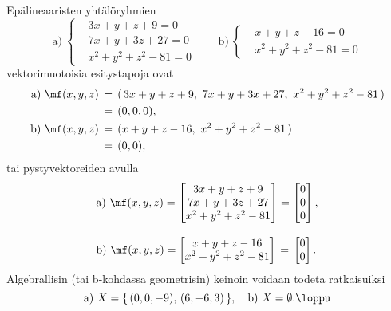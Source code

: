\begin{Exa}
Epälineaaristen yhtälöryhmien
\[ 
\text{a)} \ \left\{ \begin{aligned} 
                    &3x+y+z+9=0 \\ &7x+y+3z+27=0 \\ &x^2+y^2+z^2-81=0 
                    \end{aligned} \right.  \qquad
\text{b)} \ \left\{ \begin{aligned} &x+y+z-16=0 \\ &x^2+y^2+z^2-81=0 \end{aligned} \right.
\]
vektorimuotoisia esitystapoja ovat
\begin{align*}
\text{a)}\ \mf(x,y,z)\,&=\,(\,3x+y+z+9,\ 7x+y+3x+27,\ x^2+y^2+z^2-81\,) \\
                       &=\,(0,0,0), \\
\text{b)}\ \mf(x,y,z)\,&=\,(x+y+z-16,\ x^2+y^2+z^2-81\,) \\
                       &=\,(0,0),
\end{align*}
tai pystyvektoreiden avulla
\begin{align*}
&\text{a)}\ \mf(x,y,z) = \begin{bmatrix} 
                         3x+y+z+9 \\ 7x+y+3z+27 \\ x^2+y^2+z^2-81 
                         \end{bmatrix} 
                       = \begin{bmatrix} 0\\0\\0 \end{bmatrix}, \\[3mm]
&\text{b)}\ \mf(x,y,z) = \begin{bmatrix} 
                         x+y+z-16 \\ x^2+y^2+z^2-81 
                         \end{bmatrix}\,=\,\begin{bmatrix} 0\\0 \end{bmatrix}.
\end{align*}
Algebrallisin (tai b-kohdassa geometrisin) keinoin voidaan todeta ratkaisuiksi
\[
\text{a)}\ X = \{\,(0,0,-9),\,(6,-6,3)\,\}, \quad \text{b)}\ X=\emptyset. \loppu
\]
\end{Exa}


